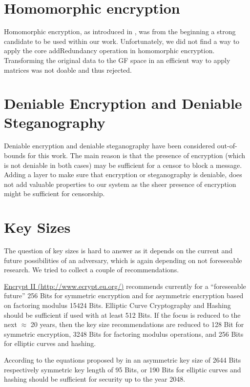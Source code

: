\section{Homomorphic encryption}
Homomorphic encryption, as introduced in \cite{feldman1987practical}, was from the beginning a strong candidate to be used within our work. Unfortunately, we did not find a way to apply the core addRedundancy operation in homomorphic encryption. Transforming the original data to the GF space in an efficient way to apply matrices was not doable and thus rejected.


\section{Deniable Encryption and Deniable Steganography}

Deniable encryption and deniable steganography have been considered out-of-bounds for this work. The main reason is that the presence of encryption (which is not deniable in both cases) may be sufficient for a censor to block a message. Adding a layer to make sure that encryption or steganography is deniable, does not add valuable properties to our system as the sheer presence of encryption might be sufficient for censorship. 

\section{Key Sizes\label{sec:keySize}}

The question of key sizes is hard to answer as it depends on the current and future possibilities of an adversary, which is again depending on not foreseeable research. We tried to collect a couple of recommendations.

\href{http://www.ecrypt.eu.org/}{Encrypt II (http://www.ecrypt.eu.org/)} recommends currently for a ``foreseeable future'' 256 Bits for symmetric encryption and for asymmetric encryption based on factoring modulus 15424 Bits. Elliptic Curve Cryptography and Hashing should be sufficient if used with at least 512 Bits. If the focus is reduced to the next $\approx$ 20 years, then the key size recommendations are reduced to 128 Bit for symmetric encryption, 3248 Bits for factoring modulus operations, and 256 Bits for elliptic curves and hashing.

According to the equations proposed by \citeauthor{Lenstra04keylength.} in \cite{Lenstra04keylength.} an asymmetric key size of 2644 Bits respectively symmetric key length of 95 Bits, or 190 Bits for elliptic curves and hashing should be sufficient for security up to the year 2048. 

